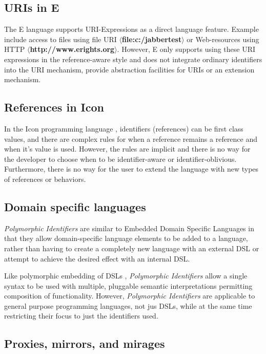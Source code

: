 \documentclass[preprint,authoryear]{llncs}
\begin{document}
\subsection{URIs in E}

The E language\cite{MillerRobustComposition}  supports URI-Expressions as a
direct language feature.  Example include access to files
using file URI  {\bf $\langle$file:c:/jabbertest$\rangle$} or Web-resources using HTTP {\bf  $\langle$http://www.erights.org$\rangle$}.  However,
E only supports using these URI expressions in the reference-aware style and does not integrate 
ordinary identifiers into the URI mechanism, provide abstraction facilities 
for URIs or an extension mechanism. 


\subsection{References in Icon}

In the Icon programming language \cite{IconRef} , identifiers (references) can be first class values,
and there are complex rules for when a reference remains a reference and when
it's value is used.  However, the rules are implicit and there is no way for the 
developer to choose when to be identifier-aware or identifier-oblivious.  Furthermore,
there is no way for the user to extend the language with new types of references 
or behaviors.



\subsection{Domain specific languages}

\emph{Polymorphic Identifiers} are similar to Embedded Domain Specific Languages\cite{edsl}
in that they allow domain-specific language elements to be added to a language, rather
than having to create a completely new language with an external DSL or attempt to 
achieve the desired effect with an internal DSL\cite{fowlerdsl}.  

Like polymorphic embedding of DSLs \cite{polydsl}, \emph{Polymorphic Identifiers} allow
a single syntax to be used with multiple, pluggable semantic interpretations permitting
composition of functionality\cite{embeddeddsl}.  However, \emph{Polymorphic Identifiers}
are applicable to general purpose programming languages, not jus DSLs, while
at the same time restricting their focus to just the identifiers used.

\subsection{Proxies, mirrors, and mirages}
\end{document}
